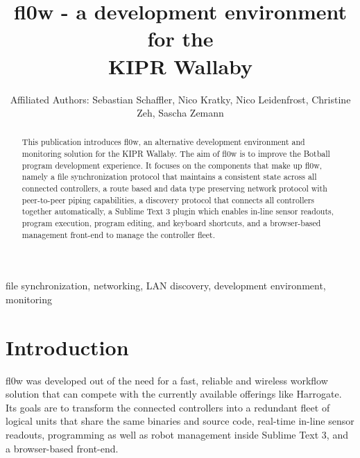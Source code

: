 \documentclass[conference,a4paper]{IEEEtran}
\begin{document}
\title{fl0w - a development environment for the\\ KIPR Wallaby}
\author{
Affiliated Authors: Sebastian Schaffler, Nico Kratky, Nico Leidenfrost, Christine Zeh, Sascha Zemann
}
\maketitle


\begin{abstract}
This publication introduces fl0w, an alternative development environment and monitoring solution for the KIPR Wallaby. The aim of fl0w is to improve the Botball program development experience. It focuses on the components that make up fl0w, namely a file synchronization protocol that maintains a consistent state across all connected controllers, a route based and data type preserving network protocol with peer-to-peer piping capabilities, a discovery protocol that connects all controllers together automatically, a Sublime Text 3 plugin which enables in-line sensor readouts, program execution, program editing, and keyboard shortcuts, and a browser-based management front-end to manage the controller fleet.\\
\end{abstract}

\begin{IEEEkeywords}
file synchronization, networking, LAN discovery, development environment, monitoring
\end{IEEEkeywords}



\section{Introduction}
fl0w\cite{fl0w:Philip Trauner} was developed out of the need for a fast, reliable and wireless workflow solution that can compete with the currently available offerings like Harrogate\cite{Harrogate:KIPR}. Its goals are to transform the connected controllers into a redundant fleet of logical units that share the same binaries and source code, real-time in-line sensor readouts, programming as well as robot management inside Sublime Text 3\cite{Sublime Text 3:Sublime HQ}, and a browser-based front-end.
\end{document}
